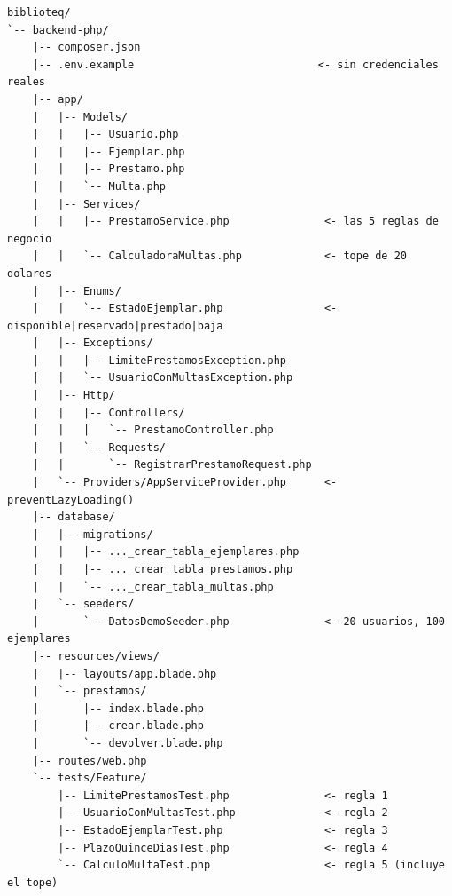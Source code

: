 \documentclass[11pt,a4paper,openany]{book}
\begin{document}
\begin{lstlisting}[style=plano,caption={Estructura de archivos del ejercicio 4.B dentro del monorepo del PFC.},label={lst:u4:arbol-4b}]
biblioteq/
`-- backend-php/
    |-- composer.json
    |-- .env.example                             <- sin credenciales reales
    |-- app/
    |   |-- Models/
    |   |   |-- Usuario.php
    |   |   |-- Ejemplar.php
    |   |   |-- Prestamo.php
    |   |   `-- Multa.php
    |   |-- Services/
    |   |   |-- PrestamoService.php               <- las 5 reglas de negocio
    |   |   `-- CalculadoraMultas.php             <- tope de 20 dolares
    |   |-- Enums/
    |   |   `-- EstadoEjemplar.php                <- disponible|reservado|prestado|baja
    |   |-- Exceptions/
    |   |   |-- LimitePrestamosException.php
    |   |   `-- UsuarioConMultasException.php
    |   |-- Http/
    |   |   |-- Controllers/
    |   |   |   `-- PrestamoController.php
    |   |   `-- Requests/
    |   |       `-- RegistrarPrestamoRequest.php
    |   `-- Providers/AppServiceProvider.php      <- preventLazyLoading()
    |-- database/
    |   |-- migrations/
    |   |   |-- ..._crear_tabla_ejemplares.php
    |   |   |-- ..._crear_tabla_prestamos.php
    |   |   `-- ..._crear_tabla_multas.php
    |   `-- seeders/
    |       `-- DatosDemoSeeder.php               <- 20 usuarios, 100 ejemplares
    |-- resources/views/
    |   |-- layouts/app.blade.php
    |   `-- prestamos/
    |       |-- index.blade.php
    |       |-- crear.blade.php
    |       `-- devolver.blade.php
    |-- routes/web.php
    `-- tests/Feature/
        |-- LimitePrestamosTest.php               <- regla 1
        |-- UsuarioConMultasTest.php              <- regla 2
        |-- EstadoEjemplarTest.php                <- regla 3
        |-- PlazoQuinceDiasTest.php               <- regla 4
        `-- CalculoMultaTest.php                  <- regla 5 (incluye el tope)
\end{lstlisting}
\end{document}
